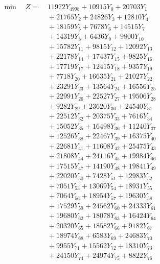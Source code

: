 \documentclass[a4paper,10pt]{article}
\begin{document}
\allowdisplaybreaks
{\small
\begin{align}
\min \quad Z = &\; 11972 Y_{4998} + 10915 Y_{0} + 20703 Y_{1} \\[0.3ex]
&\;  + 21765 Y_{2} + 24826 Y_{3} + 12810 Y_{4} \\[0.3ex]
&\;  + 18159 Y_{5} + 7678 Y_{6} + 14515 Y_{7} \\[0.3ex]
&\;  + 14319 Y_{8} + 6436 Y_{9} + 9800 Y_{10} \\[0.3ex]
&\;  + 15782 Y_{11} + 9815 Y_{12} + 12092 Y_{13} \\[0.3ex]
&\;  + 22178 Y_{14} + 17437 Y_{15} + 9825 Y_{16} \\[0.3ex]
&\;  + 17719 Y_{17} + 12415 Y_{18} + 9357 Y_{19} \\[0.3ex]
&\;  + 7718 Y_{20} + 16635 Y_{21} + 21027 Y_{22} \\[0.3ex]
&\;  + 23291 Y_{23} + 13564 Y_{24} + 16556 Y_{25} \\[0.3ex]
&\;  + 22991 Y_{26} + 22527 Y_{27} + 19506 Y_{28} \\[0.5ex]\allowbreak
&\;  + 9282 Y_{29} + 23620 Y_{30} + 24540 Y_{31} \\[0.3ex]
&\;  + 22512 Y_{32} + 20375 Y_{33} + 7616 Y_{34} \\[0.3ex]
&\;  + 15052 Y_{35} + 16498 Y_{36} + 11240 Y_{37} \\[0.3ex]
&\;  + 12526 Y_{38} + 22467 Y_{39} + 16375 Y_{40} \\[0.3ex]
&\;  + 22681 Y_{41} + 11608 Y_{42} + 25475 Y_{43} \\[0.3ex]
&\;  + 21808 Y_{44} + 24116 Y_{45} + 19984 Y_{46} \\[0.3ex]
&\;  + 17515 Y_{47} + 14190 Y_{48} + 19841 Y_{49} \\[0.3ex]
&\;  + 22020 Y_{50} + 7428 Y_{51} + 12983 Y_{52} \\[0.3ex]
&\;  + 7051 Y_{53} + 13069 Y_{54} + 18931 Y_{55} \\[0.3ex]
&\;  + 7064 Y_{56} + 18954 Y_{57} + 19630 Y_{58} \\[0.5ex]\allowbreak
&\;  + 17529 Y_{59} + 24562 Y_{60} + 24333 Y_{61} \\[0.3ex]
&\;  + 19680 Y_{62} + 18078 Y_{63} + 16424 Y_{64} \\[0.3ex]
&\;  + 20320 Y_{65} + 18582 Y_{66} + 9182 Y_{67} \\[0.3ex]
&\;  + 18974 Y_{68} + 6583 Y_{69} + 24683 Y_{70} \\[0.3ex]
&\;  + 9955 Y_{71} + 15562 Y_{72} + 18310 Y_{73} \\[0.3ex]
&\;  + 24150 Y_{74} + 24974 Y_{75} + 8822 Y_{76} \\[0.3ex]

\end{align}}
\end{document}

